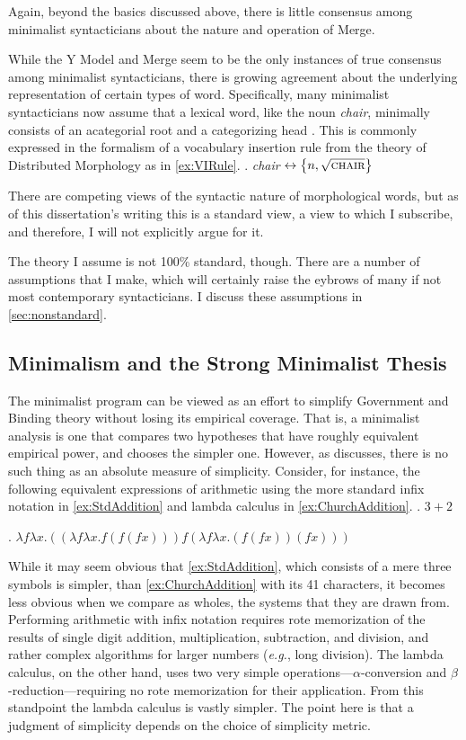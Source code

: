 \documentclass[MilwayThesis]{subfiles}
\begin{document}
Again, beyond the basics discussed above, there is little consensus among minimalist syntacticians about the nature and operation of Merge.

While the Y Model and Merge seem to be the only instances of true consensus among minimalist syntacticians, there is growing agreement about the underlying representation of certain types of word.
Specifically, many minimalist syntacticians now assume that a lexical word, like the noun \textit{chair}, minimally consists of an acategorial root and a categorizing head \parencite{borer2005name,marantz1997no}.
This is commonly expressed in the formalism of a vocabulary insertion rule from the theory of Distributed Morphology as in \cref{ex:VIRule}.
\ex.\label{ex:VIRule} \textit{chair} $\leftrightarrow \left\{ n, \sqrt{\textsc{chair}} \right\}$

There are competing views of the syntactic nature of morphological words, but as of this dissertation's writing this is a standard view, a view to which I subscribe, and therefore, I will not explicitly argue for it.

The theory I assume is not 100\% standard, though.
There are a number of assumptions that I make, which will certainly raise the eybrows of many if not most contemporary syntacticians.
I discuss these assumptions in \cref{sec:nonstandard}.

\subsection{Minimalism and the Strong Minimalist Thesis}
The minimalist program can be viewed as an effort to simplify Government and Binding theory without losing its empirical coverage.
That is, a minimalist analysis is one that compares two hypotheses that have roughly equivalent empirical power, and chooses the simpler one.
However, as \textcite{chomsky1965aspects} discusses, there is no such thing as an absolute measure of simplicity.
Consider, for instance, the following equivalent expressions of arithmetic using the more standard infix notation in \cref{ex:StdAddition} and lambda calculus in \cref{ex:ChurchAddition}.
\ex.\label{ex:StdAddition} $3 + 2$

\ex.\label{ex:ChurchAddition} $\lambda f \lambda x . ((\lambda f \lambda x . f(f(f x))) f(\lambda f \lambda x . (f(f x))(f x)))$

While it may seem obvious that \cref{ex:StdAddition}, which consists of a mere three symbols is simpler, than \cref{ex:ChurchAddition} with its 41 characters, it becomes less obvious when we compare as wholes, the systems that they are drawn from.
Performing arithmetic with infix notation requires rote memorization of the results of single digit addition, multiplication, subtraction, and division, and rather complex algorithms for larger numbers (\textit{e.g.}, long division).
The lambda calculus, on the other hand, uses two very simple operations---$\alpha$-conversion and $\beta$-reduction---requiring no rote memorization for their application.
From this standpoint the lambda calculus is vastly simpler.
The point here is that a judgment of simplicity depends on the choice of simplicity metric.
\end{document}

